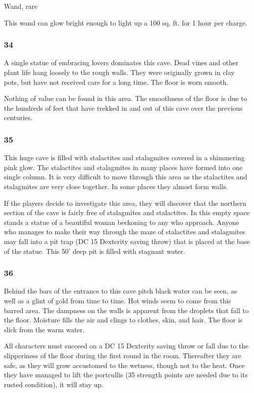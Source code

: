 \documentclass[palace_of_the_silver_princess]{subfiles}
\begin{document}
{Wand, rare}

This wand can glow bright enough to light up a 100 sq. ft. for 1 hour
per charge.

\subsubsection{34}
\begin{quotebox}
    A single statue of embracing lovers dominates this cave. Dead vines
    and other plant life hang loosely to the rough walls. They were
    originally grown in clay pots, but have not received care for a long
    time. The floor is worn smooth.
\end{quotebox}

Nothing of value can be found in this area. The smoothness of the floor
is due to the hundreds of feet that have trekked in and out of this cave
over the previous centuries.

\subsubsection{35}
\begin{quotebox}
    This huge cave is filled with stalactites and stalagmites covered
    in a shimmering pink glow. The stalactites and stalagmites in many
    places have formed into one single column. It is very difficult to
    move through this area as the stalactites and stalagmites are very
    close together. In some places they almost form walls.
\end{quotebox}

If the players decide to investigate this area, they will discover that
the northern section of the cave is fairly free of stalagmites and
stalactites. In this empty space stands a statue of a beautiful woman
beckoning to any who approach. Anyone who manages to make their way
through the maze of stalactites and stalagmites may fall into a pit trap
(DC 15 Dexterity saving throw) that is placed at the base of the statue.
This 50’ deep pit is filled with stagnant water.

\subsubsection{36}
\begin{quotebox}
    Behind the bars of the entrance to this cave pitch black water can
    be seen, as well as a glint of gold from time to time. Hot winds
    seem to come from this barred area. The dampness on the walls is
    apparent from the droplets that fall to the floor. Moisture fills
    the air and clings to clothes, skin, and hair. The floor is slick
    from the warm water.
\end{quotebox}

All characters must succeed on a DC 15 Dexterity saving throw or  fall
due to the slipperiness of the floor during the first round in the room.
Thereafter they are safe, as they will grow accustomed to the wetness,
though not to the heat.  Once they have managed to lift the portcullis
(35 strength points are needed due to its rusted condition), it will
stay up.
\end{document}

